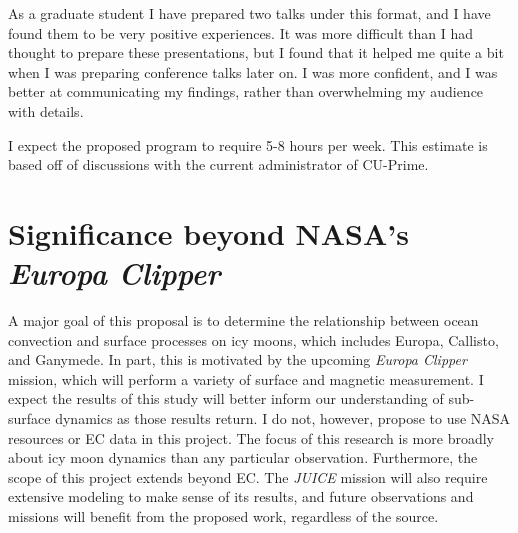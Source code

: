 \documentclass[12pt]{article}
\begin{document}
As a graduate student I have prepared two talks under this format, and I have found them to be very positive experiences. It was more difficult than I had thought to prepare these presentations, but I found that it helped me quite a bit when I was preparing conference talks later on. I was more confident, and I was better at communicating my findings, rather than overwhelming my audience with details. 

I expect the proposed program to require 5-8 hours per week. This estimate is based off of discussions with the current administrator of CU-Prime. 
\section{Significance beyond NASA's \textit{Europa Clipper}}
A major goal of this proposal is to determine the relationship between ocean convection and surface processes on icy moons, which includes Europa, Callisto, and Ganymede. In part, this is motivated by the upcoming \textit{Europa Clipper} mission, which will perform a variety of surface and magnetic measurement. I expect the results of this study will better inform our understanding of sub-surface dynamics as those results return. I do not, however, propose to use NASA resources or EC data in this project. The focus of this research is more broadly about icy moon dynamics than any particular observation. Furthermore, the scope of this project extends beyond EC. The \textit{JUICE} mission will also require extensive modeling to make sense of its results, and future observations and missions will benefit from the proposed work, regardless of the source.

\begin{spacing}{0.4}

\printbibliography

\end{spacing}
\end{document}
